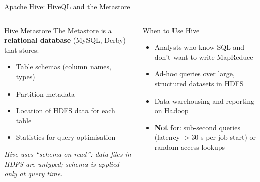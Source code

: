 \documentclass[aspectratio=169,10pt]{beamer}
\begin{document}
\begin{frame}{Apache Hive: HiveQL and the Metastore}
\begin{columns}[T]
      \begin{block}{Hive Metastore}
        The Metastore is a \textbf{relational database} (MySQL, Derby) that stores:
        \begin{itemize}
          \small
          \item Table schemas (column names, types)
          \item Partition metadata
          \item Location of HDFS data for each table
          \item Statistics for query optimisation
        \end{itemize}
        \textit{Hive uses ``schema-on-read'': data files in HDFS are untyped; schema is applied only at query time.}
      \end{block}
      \vspace{4pt}
      \begin{alertblock}{When to Use Hive}
        \begin{itemize}
          \small
          \item Analysts who know SQL and don't want to write MapReduce
          \item Ad-hoc queries over large, structured datasets in HDFS
          \item Data warehousing and reporting on Hadoop
          \item \textbf{Not} for: sub-second queries (latency $>$30 s per job start) or random-access lookups
        \end{itemize}
      \end{alertblock}
  \end{columns}
\end{frame}
\end{document}
